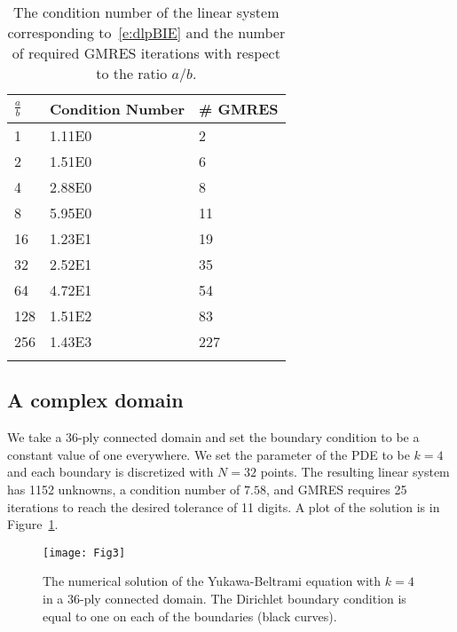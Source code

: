 \begin{table}[htps]
\caption{\label{t:example3} The condition number of the linear system
corresponding to~\eqref{e:dlpBIE} and the number of required GMRES
iterations with respect to the ratio $a/b$.}
\centering
\begin{tabular*}{0.8\textwidth}{@{\extracolsep{\fill}}lll}
$\frac{a}{b}$ & Condition Number & \# GMRES \\
\hline\noalign{\smallskip}
1   & 1.11E0 & 2   \\ 
2   & 1.51E0 & 6   \\
4   & 2.88E0 & 8   \\
8   & 5.95E0 & 11  \\
16  & 1.23E1 & 19  \\
32  & 2.52E1 & 35  \\
64  & 4.72E1 & 54  \\
128 & 1.51E2 & 83  \\
256 & 1.43E3 & 227 \\
\noalign{\smallskip}\hline
\end{tabular*}
\end{table}


\subsection{A complex domain}
We take a 36-ply connected domain and set the boundary condition to be a
constant value of one everywhere.  We set the parameter of the PDE to be
$k=4$ and each boundary is discretized with $N=32$ points.  The
resulting linear system has 1152 unknowns, a condition number of $7.58$,
and GMRES requires 25 iterations to reach the desired tolerance of 11
digits.  A plot of the solution is in Figure~\ref{f:36ply}.

\begin{figure}
  \centering
  \texttt{[image: Fig3]}
  \caption{\label{f:36ply} The numerical solution of the Yukawa-Beltrami
  equation with $k=4$ in a 36-ply connected domain.  The Dirichlet
  boundary condition is equal to one on each of the boundaries (black
  curves).}
\end{figure}

